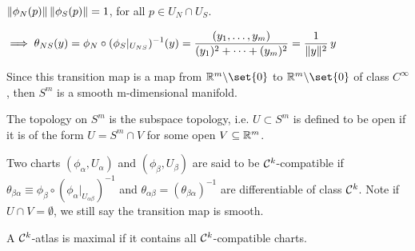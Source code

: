 \begin{example}
\begin{enumerate}[(1)]
		\begin{fact}
			$\lVert\phi_N(p)\rVert \,\lVert\phi_S(p)\rVert =1$, for all $p\in U_N \cap U_S$.
			
			$\displaystyle \implies \theta_{NS}(y) = {\phi_N \circ ({\phi_S}\rvert_{U_{NS}})^{-1}}(y) = 
			\frac{(y_1,\dots,y_m)}{(y_1)^2+\dots+(y_m)^2} = \frac{1}{\lVert y\rVert^2}\, y$

			Since this transition map is a map\footnotemark{} from $\bbR^m\backslash\set{0}$ to $\bbR^m\backslash\set{0}$ of class $C^\infty$, then $S^m$ is a smooth m-dimensional manifold.
		\end{fact}

		\begin{notabene}
			The topology on $S^m$ is the subspace topology, i.e. $U \subset S^m$ is defined to be open if it is of the form $U=S^m \cap V$ for some open $V\subseteq \mathbb R^m$.
		\end{notabene}
	
	\end{enumerate}
\end{example}

\begin{definition}
	Two charts $(\phi_\alpha, U_\alpha)$ and $(\phi_\beta, U_\beta)$ are said to be $\mathcal{C}^k$-compatible if $\theta_{\beta\alpha} \equiv {\phi_\beta \circ ({\phi_\alpha}\rvert_{U_{\alpha\beta}})^{-1}}$ and $\theta_{\alpha\beta} = (\theta_{\beta\alpha})^{-1}$ are differentiable of class $\mathcal{C}^k$. Note if $U\cap V = \emptyset$, we still say the transition map is smooth.
\end{definition}

\begin{definition}
	A $\mathcal{C}^k$-atlas is maximal if it contains all $\mathcal{C}^k$-compatible charts.
\end{definition}




